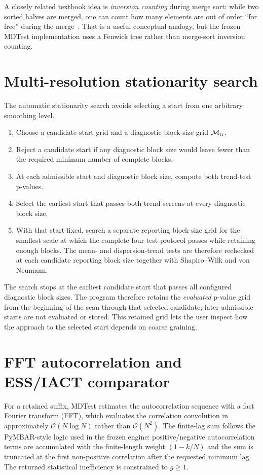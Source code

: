 \documentclass[11pt,oneside]{report}
\begin{document}
A closely related textbook idea is \emph{inversion counting} during merge sort: while two sorted halves are merged, one can count how many elements are out of order ``for free'' during the merge~\cite{KleinbergTardos2006}. That is a useful conceptual analogy, but the frozen MDTest implementation uses a Fenwick tree rather than merge-sort inversion counting.

\section{Multi-resolution stationarity search}
The automatic stationarity search avoids selecting a start from one arbitrary smoothing level.
\begin{enumerate}
\item Choose a candidate-start grid and a diagnostic block-size grid $\mathcal{M}_{\rm tr}$.
\item Reject a candidate start if any diagnostic block size would leave fewer than the required minimum number of complete blocks.
\item At each admissible start and diagnostic block size, compute both trend-test p-values.
\item Select the earliest start that passes both trend screens at every diagnostic block size.
\item With that start fixed, search a separate reporting block-size grid for the smallest scale at which the complete four-test protocol passes while retaining enough blocks.  The mean- and dispersion-trend tests are therefore rechecked at each candidate reporting block size together with Shapiro--Wilk and von Neumann.
\end{enumerate}
The search stops at the earliest candidate start that passes all configured diagnostic block sizes.  The program therefore retains the \emph{evaluated} p-value grid from the beginning of the scan through that selected candidate; later admissible starts are not evaluated or stored.  This retained grid lets the user inspect how the approach to the selected start depends on coarse graining.

\section{FFT autocorrelation and ESS/IACT comparator}
For a retained suffix, MDTest estimates the autocorrelation sequence with a fast Fourier transform (FFT), which evaluates the correlation convolution in approximately $\mathcal{O}(N\log N)$ rather than $\mathcal{O}(N^2)$. The finite-lag sum follows the PyMBAR-style logic used in the frozen engine: positive/negative autocorrelation terms are accumulated with the finite-length weight $(1-k/N)$ and the sum is truncated at the first non-positive correlation after the requested minimum lag. The returned statistical inefficiency is constrained to $g\ge1$.
\end{document}
